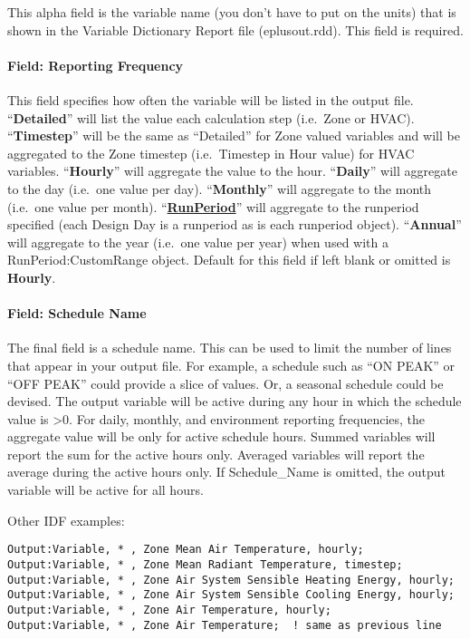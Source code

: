 This alpha field is the variable name (you don't have to put on the units) that is shown in the Variable Dictionary Report file (eplusout.rdd). This field is required.

\paragraph{Field: Reporting Frequency}\label{field-reporting-frequency}

This field specifies how often the variable will be listed in the output file. ``\textbf{Detailed}'' will list the value each calculation step (i.e.~Zone or HVAC). ``\textbf{Timestep}'' will be the same as ``Detailed'' for Zone valued variables and will be aggregated to the Zone timestep (i.e.~Timestep in Hour value) for HVAC variables. ``\textbf{Hourly}'' will aggregate the value to the hour. ``\textbf{Daily}'' will aggregate to the day (i.e.~one value per day). ``\textbf{Monthly}'' will aggregate to the month (i.e.~one value per month). ``\textbf{\hyperref[runperiod]{RunPeriod}}'' will aggregate to the runperiod specified (each Design Day is a runperiod as is each runperiod object). ``\textbf{Annual}'' will aggregate to the year  (i.e.~one value per year) when used with a RunPeriod:CustomRange object. Default for this field if left blank or omitted is \textbf{Hourly}.

\paragraph{Field: Schedule Name}\label{field-schedule-name-004}

The final field is a schedule name. This can be used to limit the number of lines that appear in your output file. For example, a schedule such as ``ON PEAK'' or ``OFF PEAK'' could provide a slice of values. Or, a seasonal schedule could be devised. The output variable will be active during any hour in which the schedule value is \textgreater{}0. For daily, monthly, and environment reporting frequencies, the aggregate value will be only for active schedule hours. Summed variables will report the sum for the active hours only. Averaged variables will report the average during the active hours only. If Schedule\_Name is omitted, the output variable will be active for all hours.

Other IDF examples:

\begin{lstlisting}
Output:Variable, * , Zone Mean Air Temperature, hourly;
Output:Variable, * , Zone Mean Radiant Temperature, timestep;
Output:Variable, * , Zone Air System Sensible Heating Energy, hourly;
Output:Variable, * , Zone Air System Sensible Cooling Energy, hourly;
Output:Variable, * , Zone Air Temperature, hourly;
Output:Variable, * , Zone Air Temperature;  ! same as previous line
\end{lstlisting}

